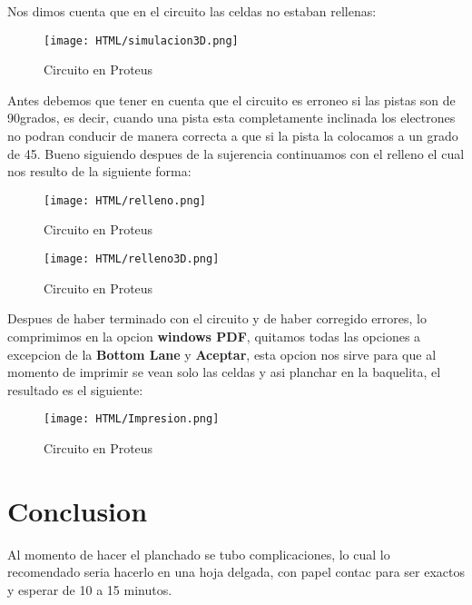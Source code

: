 \documentclass[11pt,a4paper]{article}
\begin{document}
Nos dimos cuenta que en el circuito las celdas no estaban rellenas:\\

\begin{figure}[h]
\centering
\texttt{[image: HTML/simulacion3D.png]} 
\caption{Circuito en Proteus}
\end{figure}

\newpage 

Antes debemos que tener en cuenta que el circuito es erroneo si las pistas son de 90grados, es decir, cuando una pista esta completamente inclinada los electrones no podran conducir de manera correcta a que si la pista la colocamos a un grado de 45. Bueno siguiendo despues de la sujerencia continuamos con el relleno el cual nos resulto de la siguiente forma:\\

\begin{figure}[h]
\centering
\texttt{[image: HTML/relleno.png]} 	
\caption{Circuito en Proteus}
\end{figure}

\begin{figure}[h]
\centering
\texttt{[image: HTML/relleno3D.png]} 
\caption{Circuito en Proteus}
\end{figure}

\newpage 

Despues de haber terminado con el circuito y de haber corregido errores, lo comprimimos en la opcion \textbf{windows PDF}, quitamos todas las opciones a excepcion de la \textbf{Bottom Lane} y \textbf{Aceptar}, esta opcion nos sirve para que al momento de imprimir se vean solo las celdas y asi planchar en la baquelita, el resultado es el siguiente:\\

\begin{figure}[h]
\centering
\texttt{[image: HTML/Impresion.png]} 
\caption{Circuito en Proteus}
\end{figure}

\section{Conclusion}
Al momento de hacer el planchado se tubo complicaciones, lo cual lo recomendado seria hacerlo en una hoja delgada, con papel contac para ser exactos y esperar de 10 a 15 minutos.
\end{document}
